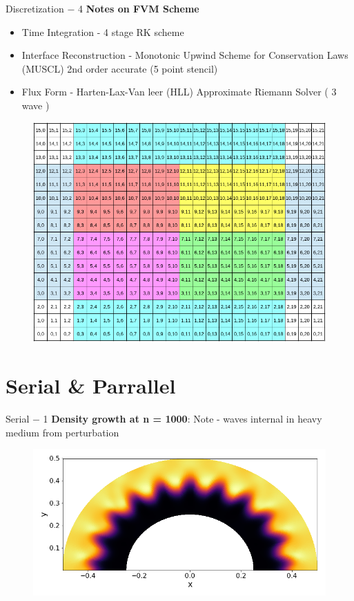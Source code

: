 \begin{frame}[t]{Discretization $-$ 4}
  \minipage{\textwidth}
  \textbf{Notes on FVM Scheme}
  \begin{itemize}
    \item Time Integration - 4 stage RK scheme
    \item Interface Reconstruction - Monotonic Upwind Scheme for Conservation Laws (MUSCL) 2nd order accurate (5 point stencil)
    \item Flux Form - Harten-Lax-Van leer (HLL) Approximate Riemann Solver ( 3 wave )
  \end{itemize}


  \endminipage\hfill
 \begin{figure}[!htbp]
   \includegraphics[width=1.0\linewidth]{../fig/16x10compDomain}
   \centering
 \end{figure}
  \endminipage\hfill
  \endminipage

\end{frame}


\section{Serial \& Parrallel}

\begin{frame}[t]{Serial $-$ 1}
  \textbf{Density growth at n = 1000}: Note - waves internal in heavy medium from perturbation
 \begin{figure}[!htbp]
   \includegraphics[width=0.85\linewidth]{fig/360x300serial}
   \centering
 \end{figure}

\end{frame}

